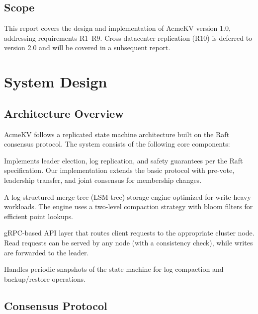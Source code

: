 \documentclass[12pt,a4paper]{report}
\begin{document}
\section{Scope}

This report covers the design and implementation of AcmeKV version 1.0, addressing requirements R1--R9. Cross-datacenter replication (R10) is deferred to version 2.0 and will be covered in a subsequent report.

\chapter{System Design}
\label{ch:design}

\section{Architecture Overview}

AcmeKV follows a replicated state machine architecture built on the Raft consensus protocol. The system consists of the following core components:

\begin{description}[style=nextline, leftmargin=2em]
  \item[Raft Consensus Module] Implements leader election, log replication, and safety guarantees per the Raft specification. Our implementation extends the basic protocol with pre-vote, leadership transfer, and joint consensus for membership changes.
  \item[Storage Engine] A log-structured merge-tree (LSM-tree) storage engine optimized for write-heavy workloads. The engine uses a two-level compaction strategy with bloom filters for efficient point lookups.
  \item[API Gateway] gRPC-based API layer that routes client requests to the appropriate cluster node. Read requests can be served by any node (with a consistency check), while writes are forwarded to the leader.
  \item[Snapshot Manager] Handles periodic snapshots of the state machine for log compaction and backup/restore operations.
\end{description}

\section{Consensus Protocol}
\end{document}
